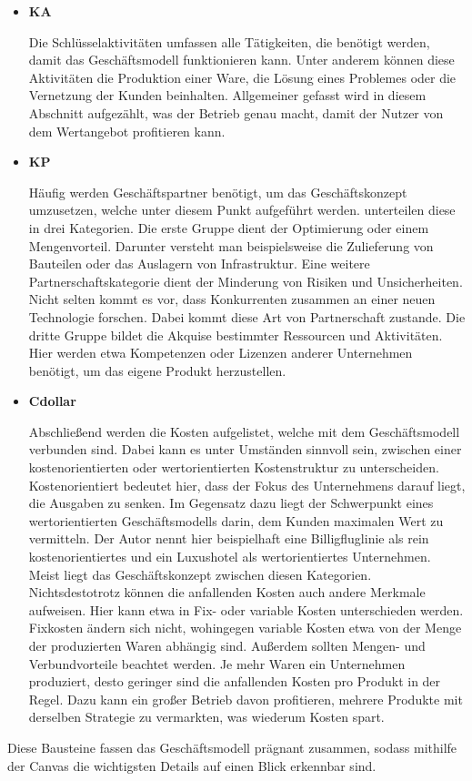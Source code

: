 \begin{itemize}
	\item \textbf{\ac{KA}}
	
	Die Schlüsselaktivitäten umfassen alle Tätigkeiten, die benötigt werden, damit das Geschäftsmodell funktionieren kann. Unter anderem können diese Aktivitäten die Produktion einer Ware, die Lösung eines Problemes oder die Vernetzung der Kunden beinhalten. Allgemeiner gefasst wird in diesem Abschnitt aufgezählt, was der Betrieb genau macht, damit der Nutzer von dem Wertangebot profitieren kann.
	
	\item \textbf{\ac{KP}}
	
	Häufig werden Geschäftspartner benötigt, um das Geschäftskonzept umzusetzen, welche unter diesem Punkt aufgeführt werden. \citeauthor{BusinessModelGeneration} unterteilen diese in drei Kategorien. Die erste Gruppe dient der Optimierung oder einem Mengenvorteil. Darunter versteht man beispielsweise die Zulieferung von Bauteilen oder das Auslagern von Infrastruktur. Eine weitere Partnerschaftskategorie dient der Minderung von Risiken und Unsicherheiten. Nicht selten kommt es vor, dass Konkurrenten zusammen an einer neuen Technologie forschen. Dabei kommt diese Art von Partnerschaft zustande. Die dritte Gruppe bildet die Akquise bestimmter Ressourcen und Aktivitäten. Hier werden etwa Kompetenzen oder Lizenzen anderer Unternehmen benötigt, um das eigene Produkt herzustellen.
	
	\item \textbf{\ac{Cdollar}}
	
	Abschließend werden die Kosten aufgelistet, welche mit dem Geschäftsmodell verbunden sind. Dabei kann es unter Umständen sinnvoll sein, zwischen einer kostenorientierten oder wertorientierten Kostenstruktur zu unterscheiden. Kostenorientiert bedeutet hier, dass der Fokus des Unternehmens darauf liegt, die Ausgaben zu senken. Im Gegensatz dazu liegt der Schwerpunkt eines wertorientierten Geschäftsmodells darin, dem Kunden maximalen Wert zu vermitteln. Der Autor nennt hier beispielhaft eine Billigfluglinie als rein kostenorientiertes und ein Luxushotel als wertorientiertes Unternehmen. Meist liegt das Geschäftskonzept zwischen diesen Kategorien. Nichtsdestotrotz können die anfallenden Kosten auch andere Merkmale aufweisen. Hier kann etwa in Fix- oder variable Kosten unterschieden werden. Fixkosten ändern sich nicht, wohingegen variable Kosten etwa von der Menge der produzierten Waren abhängig sind. Außerdem sollten Mengen- und Verbundvorteile beachtet werden. Je mehr Waren ein Unternehmen produziert, desto geringer sind die anfallenden Kosten pro Produkt in der Regel. Dazu kann ein großer Betrieb davon profitieren, mehrere Produkte mit derselben Strategie zu vermarkten, was wiederum Kosten spart.
	
\end{itemize}

Diese Bausteine fassen das Geschäftsmodell prägnant zusammen, sodass mithilfe der Canvas die wichtigsten Details auf einen Blick erkennbar sind.
\cite[S. 13-51]{BusinessModelGeneration}